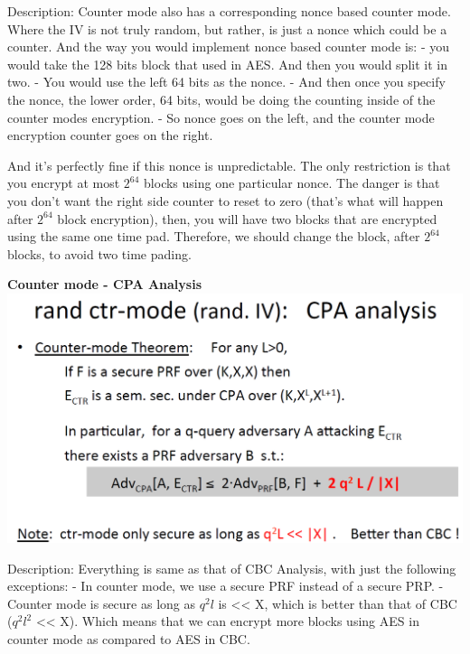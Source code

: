 \documentclass[11pt]{article}
\makeatletter
\def\maxwidth{\ifdim\Gin@nat@width>\linewidth\linewidth
    \else\Gin@nat@width\fi}
\let\Oldincludegraphics\includegraphics
\renewcommand{\includegraphics}[1]{\Oldincludegraphics[width=.8\maxwidth]{#1}}
\makeatother
\begin{document}
Description: Counter mode also has a corresponding nonce based counter
mode. Where the IV is not truly random, but rather, is just a nonce
which could be a counter. And the way you would implement nonce based
counter mode is: - you would take the 128 bits block that used in AES.
And then you would split it in two. - You would use the left 64 bits as
the nonce. - And then once you specify the nonce, the lower order, 64
bits, would be doing the counting inside of the counter modes
encryption. - So nonce goes on the left, and the counter mode encryption
counter goes on the right.

And it's perfectly fine if this nonce is unpredictable. The only
restriction is that you encrypt at most \(2^{64}\) blocks using one
particular nonce. The danger is that you don't want the right side
counter to reset to zero (that's what will happen after \(2^{64}\) block
encryption), then, you will have two blocks that are encrypted using the
same one time pad. Therefore, we should change the block, after
\(2^{64}\) blocks, to avoid two time pading.

\textbf{Counter mode - CPA Analysis}
\includegraphics{./Images/Counter-CPA-Analysis.png}

Description: Everything is same as that of CBC Analysis, with just the
following exceptions: - In counter mode, we use a secure PRF instead of
a secure PRP. - Counter mode is secure as long as \(q^{2}l\) is
\textless{}\textless{} \textbar{}X\textbar{}, which is better than that
of CBC (\(q^{2}l^{2}\) \textless{}\textless{} \textbar{}X\textbar{}).
Which means that we can encrypt more blocks using AES in counter mode as
compared to AES in CBC.
\end{document}
